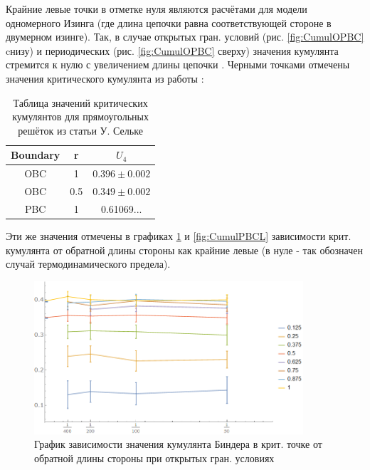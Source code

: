 Крайние левые точки в отметке нуля являются расчётами для модели одномерного Изинга (где длина цепочки равна соответствующей стороне в двумерном изинге). Так, в случае открытых гран. условий (рис. \ref{fig:CumulOPBC} cнизу) и периодических (рис. \ref{fig:CumulOPBC} сверху) значения кумулянта стремится к нулю с увеличением длины цепочки \cite{web:ProjectMagnetRepos}.
Черными точками отмечены значения критического кумулянта из работы \cite{selke2006critical}:

\begin{table}[h]
    \centering
    \begin{tabular}{|c|c|c|}
        \hline
        Boundary & r & $U_{4}$ \\ \hline
        OBC & 1 & $0.396 \pm 0.002$ \\ \hline
        OBC & 0.5 & $0.349 \pm 0.002$\\ \hline
        PBC & 1 & 0.61069...\\ \hline
    \end{tabular}
    \caption{Таблица значений критических кумулянтов для прямоугольных решёток из статьи У. Сельке \cite{selke2006critical}}
    \label{tab:U4_Selke}
\end{table}

Эти же значения отмечены в графиках \ref{fig:CumulOBCL} и \ref{fig:CumulPBCL} зависимости крит. кумулянта от обратной длины стороны как крайние левые (в нуле - так обозначен случай термодинамического предела).

\begin{figure}[!h]
    \centering
    \includegraphics[width=100mm]{Sections/Images/CumulantOBCL.png}
    \caption{График зависимости значения кумулянта Биндера в крит. точке от обратной длины стороны при открытых гран. условиях}
    \label{fig:CumulOBCL}
\end{figure}

